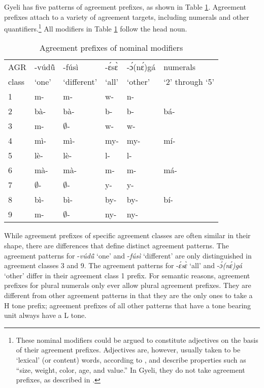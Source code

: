 Gyeli has five patterns of agreement prefixes, as shown in Table \ref{Tab:DEICMOD}. Agreement prefixes attach to a variety of agreement targets, including numerals and other quantifiers.\footnote{These nominal modifiers could be argued to constitute adjectives on the basis of their agreement prefixes. Adjectives are, however, usually taken to be `lexical' (or content) words, according to \citet[121]{rijkhoff2002}, and describe properties such as ``size, weight, color, age, and value.'' In Gyeli, they do not take agreement prefixes, as described in .} All modifiers in Table \ref{Tab:DEICMOD} follow the head noun.

\begin{table}[!h]
\centering
\begin{tabular}{l|p{2cm}p{2cm}p{2cm}p{2cm}l}
 \midrule
AGR & 	-vúdũ̂ 	& 	-fúsì  &  	-ɛ́sɛ̀		& -ɔ́(nɛ́)gá	  & numerals  \\
class & 	`one' 	& 	`different'  &  `all'	& `other'	  & `2' through `5'  \\
 \midrule
1 & 	m- 		& 	m-	& 	w-		&      n- 	&  	 \\
2 & 	bà- 		& 	bà-	& 	b-		&      b- 	& bá-	 \\
3 & 	m- 		& 	$\emptyset$- 	& w-		& 	w-  	& 	 \\
4 & 	mì- 		& 	mì-	& 	my-		& 	my- 	& mí- 	\\
5 & 	lè- 		& 	lè-	& 	l-		&      l- 	&  	\\
6 & 	mà-  		& 	mà-	& 	m-		&      m- 	 & má-	\\
7 & 	$\emptyset$- 	& $\emptyset$- & y- &     y- 	 &  	\\
8 & 	bì- 		& 	bì-	& 	by-		&     by- 	& bí- 	 \\
9 & 	m- 		& $\emptyset$-& ny-	&     ny- 	 &  	\\
 \midrule
\end{tabular}
\caption{Agreement prefixes of nominal modifiers}
\label{Tab:DEICMOD}
\end{table}

While agreement prefixes of specific agreement classes are often similar in their shape, there are differences that define distinct agreement patterns. The agreement patterns for -{\itshape vúdũ̂} `one' and -{\itshape fúsì} `different' are only distinguished in agreement classes 3 and 9. The agreement patterns for -{\itshape ɛ́sɛ̀} `all' and -{\itshape ɔ́(nɛ́)gá} `other' differ in their agreement class 1 prefix. For semantic reasons, agreement prefixes for plural numerals only ever allow plural agreement prefixes. They are different from other agreement patterns in that they are the only ones to take a H tone prefix; agreement prefixes of all other patterns that have a tone bearing unit always have a L tone.

